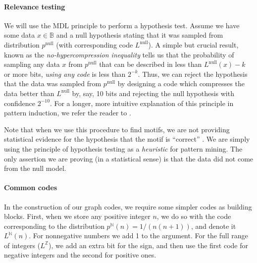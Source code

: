 \documentclass[runningheads]{style/llncs}
\newcommand{\N}{{\mathbb N}}
\newcommand{\Z}{{\mathbb Z}}
\newcommand{\B}{{\mathbb B}}
\begin{document}

\paragraph{Relevance testing} We will use the MDL principle to perform a hypothesis test. Assume we have some data $x \in \B$ and a null hypothesis stating that it was sampled from distribution $p^\text{null}$ (with corresponding code $L^\text{null}$). A simple but crucial result, known as the \emph{no-hypercompression inequality} \cite[p103]{grunwald2007minimum} tells us that the probability of sampling any data $x$ from $p^\text{null}$ that can be described in less than $L^\text{null}(x) - k$ or more bits, \emph{using any code} is less than $2^{-k}$.
Thus, we can reject the hypothesis that the data was sampled from $p^\text{null}$ by designing a code which compresses the data better than $L^\text{null}$ by, say, 10 bits and rejecting the null hypothesis with confidence $2^{-10}$. For a longer, more intuitive explanation of this principle in pattern induction, we refer the reader to \cite{bloem2018tutorial}.

Note that when we use this procedure to find motifs, we are not providing statistical evidence for the hypothesis that the motif is ``correct'' \cite[Section~4.1]{bloem2018tutorial}. We are simply using the principle of hypothesis testing as a \emph{heuristic} for pattern mining. The only assertion we are proving (in a statistical sense) is that the data did not come from the null model.

\paragraph{Common codes}
In the construction of our graph codes, we require some simpler codes as building blocks. First, when we store any positive integer $n$, we do so with the code corresponding to the distribution $p^\N(n) = 1/(n(n+1))$, and denote it $L^\N(n)$. For nonnegative numbers we add 1 to the argument. For the full range of integers ($L^\Z$), we add an extra bit for the sign, and then use the first code for negative integers and the second for positive ones.
\end{document}
